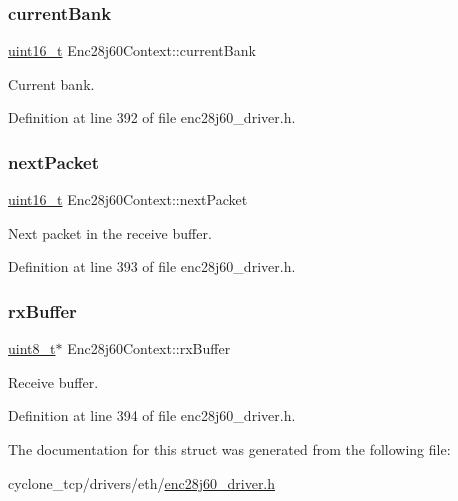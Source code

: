\subsubsection{\texorpdfstring{current\+Bank}{currentBank}}
{\footnotesize\ttfamily \hyperlink{stdint_8h_a273cf69d639a59973b6019625df33e30}{uint16\+\_\+t} Enc28j60\+Context\+::current\+Bank}



Current bank. 



Definition at line 392 of file enc28j60\+\_\+driver.\+h.

\mbox{\label{structEnc28j60Context_ac4411e438d3a831b59f26e147172e824}} 
\subsubsection{\texorpdfstring{next\+Packet}{nextPacket}}
{\footnotesize\ttfamily \hyperlink{stdint_8h_a273cf69d639a59973b6019625df33e30}{uint16\+\_\+t} Enc28j60\+Context\+::next\+Packet}



Next packet in the receive buffer. 



Definition at line 393 of file enc28j60\+\_\+driver.\+h.

\mbox{\label{structEnc28j60Context_a5dec481de213c241d15d89e02ef38e1b}} 
\subsubsection{\texorpdfstring{rx\+Buffer}{rxBuffer}}
{\footnotesize\ttfamily \hyperlink{stdint_8h_aba7bc1797add20fe3efdf37ced1182c5}{uint8\+\_\+t}$\ast$ Enc28j60\+Context\+::rx\+Buffer}



Receive buffer. 



Definition at line 394 of file enc28j60\+\_\+driver.\+h.



The documentation for this struct was generated from the following file\+:\begin{DoxyCompactItemize}
\item 
cyclone\+\_\+tcp/drivers/eth/\hyperlink{enc28j60__driver_8h}{enc28j60\+\_\+driver.\+h}\end{DoxyCompactItemize}
